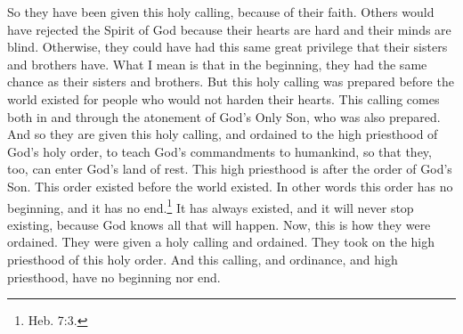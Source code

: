 So they have been given this holy calling, because of their faith. Others would have rejected the Spirit of God because their hearts are hard and their minds are blind. Otherwise, they could have had this same great privilege that their sisters and brothers have.
\bverse \iffalse Or in fine, in the first place they were on the same standing with their brethren; thus this holy calling being prepared from the foundation of the world for such as would not harden their hearts, being in and through the atonement of the Only Begotten Son, who was prepared-- \fi
What I mean is that in the beginning, they had the same chance as their sisters and brothers. But this holy calling was prepared before the world existed for people who would not harden their hearts. This calling comes both in and through the atonement of God's Only Son, who was also prepared.
\bverse \iffalse And thus being called by this holy calling, and ordained unto the high priesthood of the holy order of God, to teach his commandments unto the children of men, that they also might enter into his rest-- \fi
And so they are given this holy calling, and ordained to the high priesthood of God's holy order, to teach God's commandments to humankind, so that they, too, can enter God's land of rest.
\bverse \iffalse This high priesthood being after the order of his Son, which order was from the foundation of the world; or in other words, being without beginning of days or end of years, being prepared from eternity to all eternity, according to his foreknowledge of all things-- \fi
This high priesthood is after the order of God's Son. This order existed before the world existed. In other words this order has no beginning, and it has no end.\footnote{Heb. 7:3.} It has always existed, and it will never stop existing, because God knows all that will happen.
\bverse \iffalse Now they were ordained after this manner--being called with a holy calling, and ordained with a holy ordinance, and taking upon them the high priesthood of the holy order, which calling, and ordinance, and high priesthood, is without beginning or end-- \fi
Now, this is how they were ordained. They were given a holy calling and ordained. They took on the high priesthood of this holy order. And this calling, and ordinance, and high priesthood, have no beginning nor end.
\bverse \iffalse Thus they become high priests forever, after the order of the Son, the Only Begotten of the Father, who is without beginning of days or end of years, who is full of grace, equity, and truth.  And thus it is. Amen. \fi
